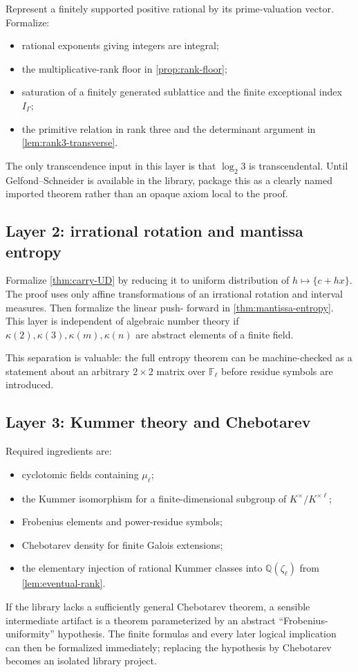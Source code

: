 \documentclass[11pt,oneside]{article}
\theoremstyle{definition}
\theoremstyle{remark}
\newcommand{\Q}{\mathbb{Q}}
\newcommand{\F}{\mathbb{F}}
\begin{document}
Represent a finitely supported positive rational by its prime-valuation
vector.  Formalize:
\begin{itemize}
\item rational exponents giving integers are integral;
\item the multiplicative-rank floor in \cref{prop:rank-floor};
\item saturation of a finitely generated sublattice and the finite exceptional
index $I_\Gamma$;
\item the primitive relation in rank three and the determinant argument in
\cref{lem:rank3-transverse}.
\end{itemize}
The only transcendence input in this layer is that
$\log_2 3$ is transcendental.  Until Gelfond--Schneider is available in the
library, package this as a clearly named imported theorem rather than an
opaque axiom local to the proof.

\subsection{Layer 2: irrational rotation and mantissa entropy}

Formalize \cref{thm:carry-UD} by reducing it to uniform distribution of
$h\mapsto\{c+hx\}$.  The proof uses only affine transformations of an
irrational rotation and interval measures.  Then formalize the linear push-
forward in \cref{thm:mantissa-entropy}.  This layer is independent of
algebraic number theory if $\kappa(2),\kappa(3),\kappa(m),\kappa(n)$ are
abstract elements of a finite field.

This separation is valuable: the full entropy theorem can be machine-checked
as a statement about an arbitrary $2\times2$ matrix over $\F_\ell$ before
residue symbols are introduced.

\subsection{Layer 3: Kummer theory and Chebotarev}

Required ingredients are:
\begin{itemize}
\item cyclotomic fields containing $\mu_\ell$;
\item the Kummer isomorphism for a finite-dimensional subgroup of
      $K^\times/K^{\times\ell}$;
\item Frobenius elements and power-residue symbols;
\item Chebotarev density for finite Galois extensions;
\item the elementary injection of rational Kummer classes into
      $\Q(\zeta_\ell)$ from \cref{lem:eventual-rank}.
\end{itemize}
If the library lacks a sufficiently general Chebotarev theorem, a sensible
intermediate artifact is a theorem parameterized by an abstract
``Frobenius-uniformity'' hypothesis.  The finite formulas and every later
logical implication can then be formalized immediately; replacing the
hypothesis by Chebotarev becomes an isolated library project.
\end{document}
